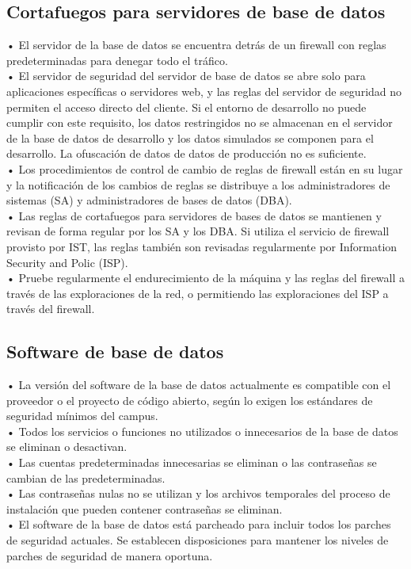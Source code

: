 \subsection{Cortafuegos para servidores de base de datos}
• El servidor de la base de datos se encuentra detrás de un firewall con reglas predeterminadas para denegar todo el tráfico.\\
• El servidor de seguridad del servidor de base de datos se abre solo para aplicaciones específicas o servidores web, y las reglas del servidor de seguridad no permiten el acceso directo del cliente. Si el entorno de desarrollo no puede cumplir con este requisito, los datos restringidos no se almacenan en el servidor de la base de datos de desarrollo y los datos simulados se componen para el desarrollo. La ofuscación de datos de datos de producción no es suficiente.\\
• Los procedimientos de control de cambio de reglas de firewall están en su lugar y la notificación de los cambios de reglas se distribuye a los administradores de sistemas (SA) y administradores de bases de datos (DBA).\\
• Las reglas de cortafuegos para servidores de bases de datos se mantienen y revisan de forma regular por los SA y los DBA. Si utiliza el servicio de firewall provisto por IST, las reglas también son revisadas regularmente por Information Security and Polic (ISP).\\
• Pruebe regularmente el endurecimiento de la máquina y las reglas del firewall a través de las exploraciones de la red, o permitiendo las exploraciones del ISP a través del firewall.

\subsection{Software de base de datos}
• La versión del software de la base de datos actualmente es compatible con el proveedor o el proyecto de código abierto, según lo exigen los estándares de seguridad mínimos del campus.\\
• Todos los servicios o funciones no utilizados o innecesarios de la base de datos se eliminan o desactivan.\\
• Las cuentas predeterminadas innecesarias se eliminan o las contraseñas se cambian de las predeterminadas.\\
• Las contraseñas nulas no se utilizan y los archivos temporales del proceso de instalación que pueden contener contraseñas se eliminan.\\
• El software de la base de datos está parcheado para incluir todos los parches de seguridad actuales. Se establecen disposiciones para mantener los niveles de parches de seguridad de manera oportuna.

